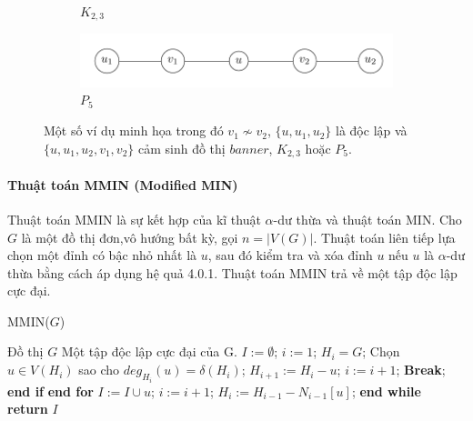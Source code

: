 \documentclass[14pt, oneside, a4paper, openany]{scrartcl}
\begin{document}
\begin{figure}[!h]
\begin{subfigure}{.3\textwidth}
		\caption{$K_{2,3}$}
		\label{fig:sub2}
	\end{subfigure}
	\begin{subfigure}{.3\textwidth}
		\centering
		\includegraphics[scale=0.35]{figures/p5.png}
		\caption{$P_5$}
		\label{fig:sub2}
	\end{subfigure}
	\caption{Một số ví dụ minh họa trong đó  $v_1 \nsim v_2$, $\{u,u_1,u_2\}$ là độc lập và  $\{u,u_1,u_2,v_1,v_2\}$ cảm sinh đồ thị $ banner$, $K_{2,3}$ hoặc  $P_5$.}
	\label{fig:redundan}
\end{figure}
%
\paragraph{Thuật toán MMIN (Modified MIN)}
Thuật toán MMIN  là sự kết hợp của kĩ thuật $\alpha$-dư thừa và thuật toán MIN.
Cho $G$ là một đồ thị đơn,vô hướng bất kỳ, gọi $n = |V(G)|$. Thuật toán liên tiếp lựa chọn một đỉnh có bậc nhỏ nhất là $u$, sau đó kiểm tra và xóa đỉnh $u$ nếu $u$ là $\alpha$-dư thừa bằng cách áp dụng hệ quả 4.0.1. 
Thuật toán MMIN trả về một tập độc lập cực đại.


\begin{algorithm}
	\caption{MMIN($G$)}\label{MMIN}
	\begin{algorithmic}[1]
		\INPUT Đồ thị $G$
		\OUTPUT Một tập độc lập cực đại của G.
		\State $I := \emptyset$; $i:=1$; $H_i=G$;
		\State Chọn $u \in V(H_i)$  sao cho $deg_{H_i}(u) = \delta(H_i)$;
				\State $H_{i+1} := H_i - u$; $i := i+1$;  
				\State \textbf{Break};
			\EndIf
			\State \textbf{end if}
		\EndFor
		\State \textbf{end for}				
		\State $I := I \cup {u}$; $i := i+1$; $H_i := H_{i-1} - N_{i-1}[u]$;
		\EndWhile
	\State \textbf{end while}
	\State \textbf{return} $I$
	\end{algorithmic}
\end{algorithm}
\end{document}
